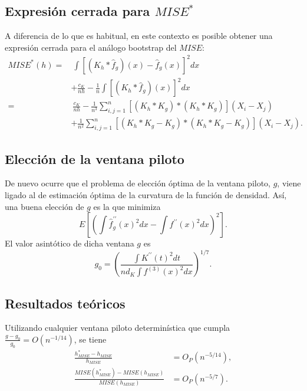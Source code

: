 \documentclass[]{book}
\theoremstyle{break}
\theoremstyle{definition}
\theoremstyle{definition}
\theoremstyle{definition}
\theoremstyle{remark}
\begin{document}
\subsection{\texorpdfstring{Expresión cerrada para
\(MISE^{\ast}\)}{Expresión cerrada para MISE\^{}\{\textbackslash{}ast\}}}\label{expresiuxf3n-cerrada-para-miseast}

A diferencia de lo que es habitual, en este contexto es posible obtener
una expresión cerrada para el análogo bootstrap del \(MISE\):
\[\begin{aligned}
MISE^{\ast}\left( h \right) =&\ \int \left[ \left( K_{h}\ast 
\hat{f}_{g} \right) \left( x \right) -\hat{f}_{g}\left( x \right) \right]^2dx \\
&+\frac{c_{K}}{nh}-\frac{1}{n}\int \left[ \left( K_{h}\ast 
\hat{f}_{g} \right) \left( x \right) \right]^2dx \\
=&\ \frac{c_{K}}{nh}-\frac{1}{n^{3}}\sum_{i,j=1}^{n}\left[ \left( K_{h}\ast
K_{g} \right) \ast \left( K_{h}\ast K_{g} \right) \right] \left(
X_i-X_j \right) \\
&+\frac{1}{n^2}\sum_{i,j=1}^{n}\left[ \left( K_{h}\ast K_{g}-K_{g} \right)
\ast \left( K_{h}\ast K_{g}-K_{g} \right) \right] \left( X_i-X_j \right).\end{aligned}\]

\subsection{Elección de la ventana
piloto}\label{elecciuxf3n-de-la-ventana-piloto}

De nuevo ocurre que el problema de elección óptima de la ventana piloto,
\(g\), viene ligado al de estimación óptima de la curvatura de la
función de densidad. Así, una buena elección de \(g\) es la que
minimiza\[E\left[ \left( \int \hat{f}_{g}^{\prime \prime }\left( x \right)^2dx-\int
f^{\prime \prime }\left( x \right)^2dx \right)^2\right] .\]El valor
asintótico de dicha ventana \(g\)
es\[g_{0}=\left( \frac{\int K^{\prime \prime }\left( t \right)^2dt}{nd_{K}\int
f^{\left( 3 \right)}\left( x \right)^2dx} \right)^{1/7}.\]

\subsection{Resultados teóricos}\label{resultados-teuxf3ricos}

Utilizando cualquier ventana piloto determinística que cumpla
\(\frac{g-g_{0}}{g_{0}}=O\left( n^{-1/14} \right)\), se tiene
\[\begin{aligned}
\frac{h_{MISE}^{\ast}-h_{MISE}}{h_{MISE}} &= O_{P}\left( n^{-5/14} \right),\\
\frac{MISE\left( h_{MISE}^{\ast} \right) -MISE\left( h_{MISE} \right)}{
MISE\left( h_{MISE} \right)} &= O_{P}\left( n^{-5/7} \right).
\end{aligned}\]
\end{document}
